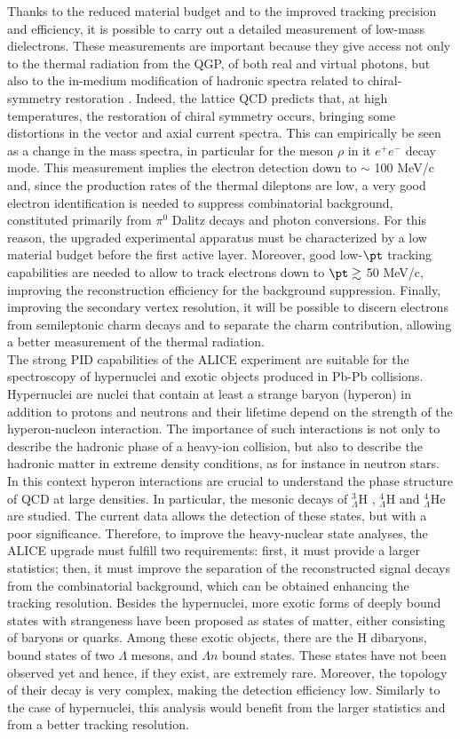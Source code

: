 Thanks to the reduced material budget and to the improved tracking precision and efficiency, it is possible to carry out a detailed measurement of low-mass dielectrons. These measurements are important because they give access not only to the thermal radiation from the QGP, of both real and virtual photons, but also to the in-medium modification of hadronic spectra related to chiral-symmetry restoration \cite{chiral}. Indeed, the lattice QCD predicts that, at high temperatures, the restoration of chiral symmetry occurs, bringing some distortions in the vector and axial current spectra. This can empirically be seen as a change in the mass spectra, in particular for the meson $\rho$ in it $e^+e^-$ decay mode. This measurement implies the electron detection down to $\sim$ 100 MeV/c and, since the production rates of the thermal dileptons are low, a very good electron identification is needed to suppress combinatorial background, constituted primarily from $\pi^0$ Dalitz decays and photon conversions. For this reason, the upgraded experimental apparatus must be characterized by a low material budget before the first active layer. Moreover, good low-$\pt$ tracking capabilities are needed to allow to track electrons down to $\pt \gtrsim $ 50 MeV/c, improving the reconstruction efficiency for the background suppression. Finally, improving the secondary vertex resolution, it will be possible to discern electrons from semileptonic charm decays and to separate the charm contribution, allowing a better measurement of the thermal radiation.\\
The strong PID capabilities of the ALICE experiment are suitable for the spectroscopy of hypernuclei and exotic objects produced in Pb-Pb collisions. Hypernuclei are nuclei that contain at least a strange baryon (hyperon) in addition to protons and neutrons and their lifetime depend on the strength of the hyperon-nucleon interaction. The importance of such interactions is not only to describe the hadronic phase of a heavy-ion collision, but also to describe the hadronic matter in extreme density conditions, as for instance in neutron stars. In this context hyperon interactions are crucial to understand the phase structure of QCD at large densities. In particular, the mesonic decays of $^{3}_{\Lambda}$H , $^{4}_{\Lambda}$H  and $^{4}_{\Lambda}$He  are studied. The current data allows the detection of these states, but with a poor significance. Therefore, to improve the heavy-nuclear state analyses, the ALICE upgrade must fulfill two requirements: first, it must provide a larger statistics; then, it must improve the separation of the reconstructed signal decays from the combinatorial background, which can be obtained enhancing the tracking resolution. Besides the hypernuclei, more exotic forms of deeply bound states with strangeness have been proposed as states of matter, either consisting of baryons or quarks. Among these exotic objects, there are the H dibaryons, bound states of two $\Lambda$ mesons, and $\Lambda n$ bound states. These states have not been observed yet and hence, if they exist, are extremely rare. Moreover, the topology of their decay is very complex, making the detection efficiency low. Similarly to the case of hypernuclei, this analysis would benefit from the larger statistics and from a better tracking resolution.
